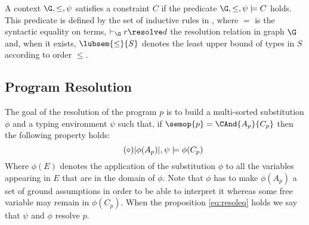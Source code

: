 \noindent A context $\extenv,\psi$ satisfies a constraint $C$ if the predicate
$\extenv,\psi \models C$ holds. This predicate is defined by the set of
inductive rules in , where $=$ is the syntactic equality on
terms, $\vdash_{\G} r \resolve d$ the resolution relation in graph $\G$ and, when it exists, $\lubsem{\leq}{S}$ denotes the least upper bound of types
in $S$ according to order $\leq$.




\subsection{Program Resolution} 

The goal of the resolution of the program $p$ is to build a multi-sorted
substitution $\phi$ and a typing environment $\psi$ such that, if $\semop{p} = \CAnd{A_p}{C_p}$ then the following property holds:\vspace*{-2mm}
\begin{equation}\tag{$\diamond$}
  \label{eq:resoleq}
 |\phi(A_p)|,\psi \models \phi(C_p)  \vspace*{-2mm}
\end{equation}
Where $\phi(E)$ denotes the application of the substitution $\phi$ to all the
variables appearing in $E$ that are in the domain of $\phi$.
Note that $\phi$ has to make $\phi(A_p)$ a set of ground assumptions in order to
be able to interpret it whereas some free variable may remain in $\phi(C_p)$.
When the proposition \ref{eq:resoleq} holds we say that $\psi$ and $\phi$
resolve $p$.


\endinput

\subsection{Program resolution}\sectionlabel{progresolutionspec} 


